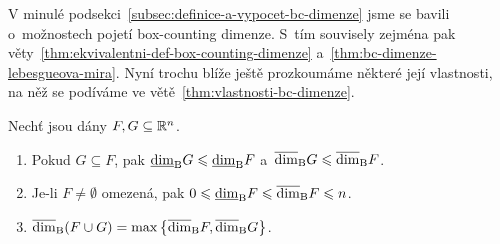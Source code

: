 V minulé podsekci~\ref{subsec:definice-a-vypocet-bc-dimenze} jsme se bavili o~možnostech pojetí box-counting dimenze. S~tím souvisely zejména pak věty~\ref{thm:ekvivalentni-def-box-counting-dimenze} a~\ref{thm:bc-dimenze-lebesgueova-mira}. Nyní trochu blíže ještě prozkoumáme některé její vlastnosti, na něž se podíváme ve větě~\ref{thm:vlastnosti-bc-dimenze}.
\begin{theorem}\label{thm:vlastnosti-bc-dimenze}
    Nechť jsou dány $F,G\subseteq\mathbb{R}^n$.
    \begin{enumerate}[label=(\roman*)]
        \item\label{thm:monotonie-bc-dimenze} Pokud $G\subseteq F$, pak $\underline{\dim}_\textup{B}{G}\leqslant\underline{\dim}_\textup{B}{F}$ a~$\overline{\dim}_\textup{B}{G}\leqslant\overline{\dim}_\textup{B}{F}$.
        \item\label{thm:rozsah-hodnot-bc-dimenze} Je-li $F\neq\emptyset$ omezená, pak $0\leqslant\underline{\dim}_\textup{B}{F}\leqslant\overline{\dim}_\textup{B}{F}\leqslant n$.
        \item\label{thm:stabilita-bc-dimenze} $\overline{\dim}_\textup{B}(F\cup G)=\max\left\{\overline{\dim}_\textup{B}{F},\overline{\dim}_\textup{B}{G}\right\}$.
    \end{enumerate}
\end{theorem}
